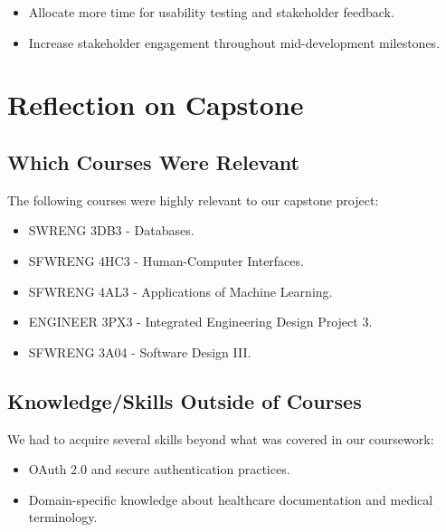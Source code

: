 \documentclass{article}
\begin{document}
 \begin{itemize}
     \item Allocate more time for usability testing and stakeholder feedback.
     \item Increase stakeholder engagement throughout mid-development milestones.
 \end{itemize}
 
 \section{Reflection on Capstone}
 
 \subsection{Which Courses Were Relevant}
 
 The following courses were highly relevant to our capstone project:
 \begin{itemize}
     \item SWRENG 3DB3 - Databases.
     \item SFWRENG 4HC3 - Human-Computer Interfaces.
     \item SFWRENG 4AL3 - Applications of Machine Learning.
     \item ENGINEER 3PX3 - Integrated Engineering Design Project 3.
     \item SFWRENG 3A04 - Software Design III.
 \end{itemize}
 
 \subsection{Knowledge/Skills Outside of Courses}
 
 We had to acquire several skills beyond what was covered in our coursework:
 \begin{itemize}
     \item OAuth 2.0 and secure authentication practices.
     \item Domain-specific knowledge about healthcare documentation and medical terminology.
 \end{itemize}
\end{document}
